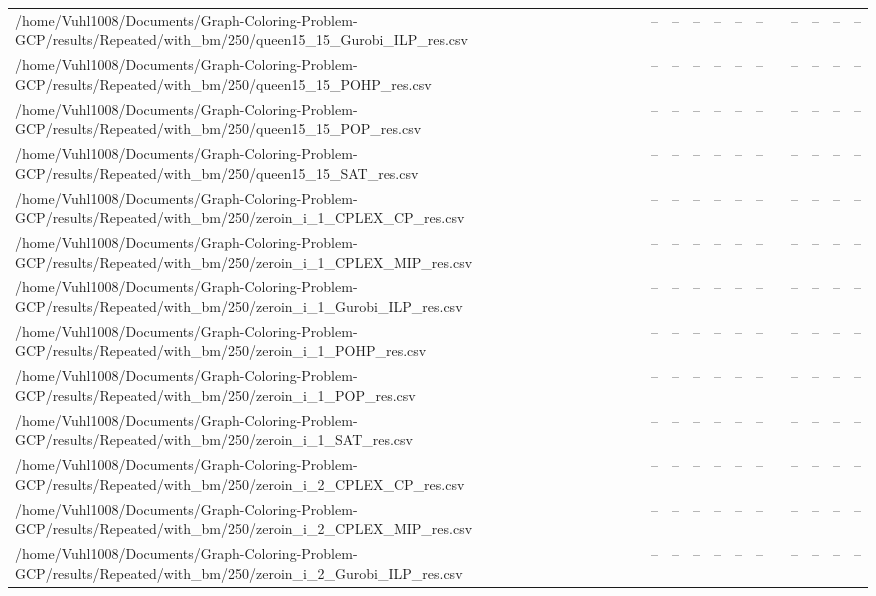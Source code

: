 \begin{table}[htbp]
\begin{tabular}{llllllllllll}
/home/Vuhl1008/Documents/Graph-Coloring-Problem-GCP/results/Repeated/with\_bm/250/queen15\_15\_Gurobi\_ILP\_res.csv & -- & -- & -- & -- & -- & -- & {} & -- & -- & -- & -- \\
/home/Vuhl1008/Documents/Graph-Coloring-Problem-GCP/results/Repeated/with\_bm/250/queen15\_15\_POHP\_res.csv & -- & -- & -- & -- & -- & -- & {} & -- & -- & -- & -- \\
/home/Vuhl1008/Documents/Graph-Coloring-Problem-GCP/results/Repeated/with\_bm/250/queen15\_15\_POP\_res.csv & -- & -- & -- & -- & -- & -- & {} & -- & -- & -- & -- \\
/home/Vuhl1008/Documents/Graph-Coloring-Problem-GCP/results/Repeated/with\_bm/250/queen15\_15\_SAT\_res.csv & -- & -- & -- & -- & -- & -- & {} & -- & -- & -- & -- \\
/home/Vuhl1008/Documents/Graph-Coloring-Problem-GCP/results/Repeated/with\_bm/250/zeroin\_i\_1\_CPLEX\_CP\_res.csv & -- & -- & -- & -- & -- & -- & {} & -- & -- & -- & -- \\
/home/Vuhl1008/Documents/Graph-Coloring-Problem-GCP/results/Repeated/with\_bm/250/zeroin\_i\_1\_CPLEX\_MIP\_res.csv & -- & -- & -- & -- & -- & -- & {} & -- & -- & -- & -- \\
/home/Vuhl1008/Documents/Graph-Coloring-Problem-GCP/results/Repeated/with\_bm/250/zeroin\_i\_1\_Gurobi\_ILP\_res.csv & -- & -- & -- & -- & -- & -- & {} & -- & -- & -- & -- \\
/home/Vuhl1008/Documents/Graph-Coloring-Problem-GCP/results/Repeated/with\_bm/250/zeroin\_i\_1\_POHP\_res.csv & -- & -- & -- & -- & -- & -- & {} & -- & -- & -- & -- \\
/home/Vuhl1008/Documents/Graph-Coloring-Problem-GCP/results/Repeated/with\_bm/250/zeroin\_i\_1\_POP\_res.csv & -- & -- & -- & -- & -- & -- & {} & -- & -- & -- & -- \\
/home/Vuhl1008/Documents/Graph-Coloring-Problem-GCP/results/Repeated/with\_bm/250/zeroin\_i\_1\_SAT\_res.csv & -- & -- & -- & -- & -- & -- & {} & -- & -- & -- & -- \\
/home/Vuhl1008/Documents/Graph-Coloring-Problem-GCP/results/Repeated/with\_bm/250/zeroin\_i\_2\_CPLEX\_CP\_res.csv & -- & -- & -- & -- & -- & -- & {} & -- & -- & -- & -- \\
/home/Vuhl1008/Documents/Graph-Coloring-Problem-GCP/results/Repeated/with\_bm/250/zeroin\_i\_2\_CPLEX\_MIP\_res.csv & -- & -- & -- & -- & -- & -- & {} & -- & -- & -- & -- \\
/home/Vuhl1008/Documents/Graph-Coloring-Problem-GCP/results/Repeated/with\_bm/250/zeroin\_i\_2\_Gurobi\_ILP\_res.csv & -- & -- & -- & -- & -- & -- & {} & -- & -- & -- & -- \\

\end{tabular}
\end{table}
